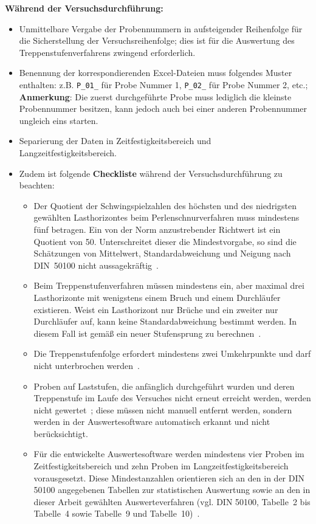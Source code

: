 \textbf{Während der Versuchsdurchführung:}
	  \begin{itemize}
	  \item Unmittelbare Vergabe der Probennummern in aufsteigender Reihenfolge für die Sicherstellung der Versuchsreihenfolge; dies ist für die Auswertung des Treppenstufenverfahrens zwingend erforderlich.
   	   \item Benennung der korrespondierenden Excel-Dateien muss folgendes Muster enthalten: z.B. \texttt{P\_01\_} für Probe Nummer 1, \texttt{P\_02\_} für Probe Nummer 2, etc.; \\ \textbf{Anmerkung}: Die zuerst durchgeführte Probe muss lediglich die kleinste Probennummer besitzen, kann jedoch auch bei einer anderen Probennummer ungleich eins starten.  
    	   \item Separierung der Daten in Zeitfestigkeitsbereich und Langzeitfestigkeitsbereich. 
    	    \item Zudem ist folgende \textbf{Checkliste} während der Versuchsdurchführung zu beachten:
 \begin{itemize}[label=--]
     \item  Der Quotient der Schwingspielzahlen des höchsten und des niedrigsten gewählten Lasthorizontes beim Perlenschnurverfahren muss mindestens fünf betragen. Ein von der Norm anzustrebender Richtwert ist ein Quotient von 50. Unterschreitet dieser die Mindestvorgabe, so sind die Schätzungen von Mittelwert, Standardabweichung und Neigung nach DIN~50100 nicht aussagekräftig~\cite[Seite~38]{DIN50100}.
    \item Beim Treppenstufenverfahren müssen mindestens ein, aber maximal drei Lasthorizonte mit wenigstens einem Bruch und einem Durchläufer existieren. Weist ein Lasthorizont nur Brüche und ein zweiter nur Durchläufer auf, kann keine Standardabweichung bestimmt werden. In diesem Fall ist gemäß  ein neuer Stufensprung zu berechnen~\cite[Seite~48]{DIN50100}.
    \item Die Treppenstufenfolge erfordert mindestens zwei Umkehrpunkte und darf nicht unterbrochen werden~\cite[Seite~59]{DIN50100}.
    \item Proben auf Laststufen, die anfänglich durchgeführt wurden und deren Treppenstufe im Laufe des Versuches nicht erneut erreicht werden, werden nicht gewertet~\cite[Seite~59]{DIN50100}; diese müssen nicht manuell entfernt werden, sondern werden in der Auswertesoftware automatisch erkannt und nicht berücksichtigt.
    \item Für die entwickelte Auswertesoftware werden mindestens vier Proben im Zeitfestigkeitsbereich und zehn Proben im Langzeitfestigkeitsbereich vorausgesetzt. Diese Mindestanzahlen orientieren sich an den in der DIN 50100 angegebenen Tabellen zur statistischen Auswertung sowie an den in dieser Arbeit gewählten Auswerteverfahren (vgl. DIN 50100, Tabelle~2 bis Tabelle~4 sowie Tabelle~9 und Tabelle~10)~\cite[Seite~30--35 und Seite~68--69]{DIN50100}.
\end{itemize}
	\end{itemize}

